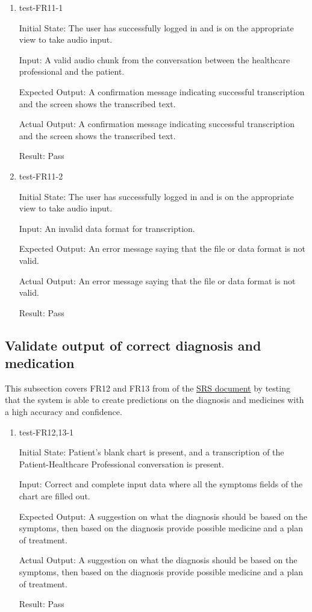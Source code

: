 \documentclass[12pt, titlepage]{article}
\begin{document}
\begin{enumerate}

  \item{test-FR11-1} \label{test-FR11-1}
  
  Initial State: The user has successfully logged in and is on the appropriate view to take audio input. 

  Input: A valid audio chunk from the conversation between the healthcare professional and the patient.

  Expected Output: A confirmation message indicating successful transcription and the screen shows the transcribed text.

  Actual Output: A confirmation message indicating successful transcription and the screen shows the transcribed text.

  Result: Pass


  \item{test-FR11-2} \label{test-FR11-2}

  Initial State: The user has successfully logged in and is on the appropriate view to take audio input.

  Input: An invalid data format for transcription.

  Expected Output: An error message saying that the file or data format is not valid.

  Actual Output: An error message saying that the file or data format is not valid.

  Result: Pass

\end{enumerate}

\subsection{Validate output of correct diagnosis and medication} \label{section:3.6}

This subsection covers FR12 and FR13 from of the \href{https://github.com/Inreet-Kaur/capstone/blob/main/docs/SRS/SRS.pdf} {SRS document} by testing that the system is able to create predictions on the diagnosis and medicines with a high accuracy and confidence.

\begin{enumerate}

  \item{test-FR12,13-1} \label{test-FR12,13-1}
  
  Initial State: Patient's blank chart is present, and a transcription of the Patient-Healthcare Professional conversation is present.

  Input: Correct and complete input data where all the symptoms fields of the chart are filled out.

  Expected Output: A suggestion on what the diagnosis should be based on the symptoms, then based on the diagnosis provide possible medicine and a plan of treatment.

  Actual Output: A suggestion on what the diagnosis should be based on the symptoms, then based on the diagnosis provide possible medicine and a plan of treatment.

  Result: Pass

\end{enumerate}
\end{document}
